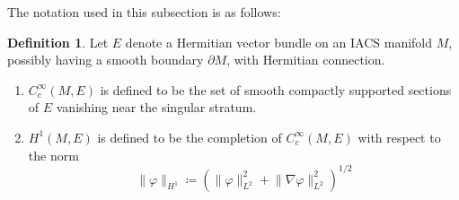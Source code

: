 \documentclass[12pt, reqno]{amsart}
\theoremstyle{plain} %
\theoremstyle{definition}
\newtheorem{definition}[theorem]{Definition}
\theoremstyle{remark}
\numberwithin{equation}{section}
\newcommand{\norm}[1]{\lVert #1 \rVert}
\newcommand{\bnd}[1]{\partial #1}
\begin{document}
The notation used in this subsection is as follows:
\begin{definition} \mbox{}
    Let \(E\) denote a Hermitian vector bundle on an IACS manifold \(M\), possibly having a smooth boundary \(\bnd{M}\), with Hermitian connection.
    \begin{enumerate}
        \item \(C_c^\infty(M, E)\) is defined to be the set of smooth compactly supported sections of \(E\) vanishing near the singular stratum.
        \item \(H^1(M, E)\) is defined to be the completion of \(C_c^\infty(M, E)\) with respect to the norm
        \begin{equation*}
            \norm{\varphi}_{H^1}\coloneqq (\norm{\varphi}_{L^2}^2+\norm{\nabla\varphi}_{L^2}^2)^{1/2}
        \end{equation*}
    \end{enumerate}
\end{definition}
\end{document}
